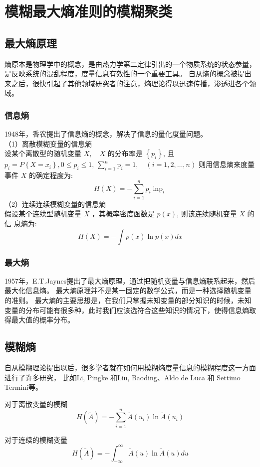 \chapter[模糊最大熵准则的模糊聚类模型]{模糊最大熵准则的模糊聚类}
\section{最大熵原理}
熵原本是物理学中的概念，是由热力学第二定律引出的一个物质系统的状态参量，是反映系统的混乱程度，度量信息有效性的一个重要工具。
自从熵的概念被提出来之后，很快引起了其他领域研究者的注意，熵理论得以迅速传播，渗透进各个领域。
\subsection{信息熵}
1948年，香农\cite{1948A}提出了信息熵的概念，解决了信息的量化度量问题。\\
（1）离散模糊变量的信息熵\\
设某个离散型的随机变量 $X, \quad X$ 的分布率是 $\left\{p_{i}\right\}$, 且 $p_{i}=P\left\{X=x_{i}\right\}, 0 \leq p_{i} \leq 1$,
$\sum_{i=1}^n \mathrm{p}_i=1, \quad(i=1,2 ,\dots, n)$ 则用信息熵来度量事件 $X$ 的确定程度为:
\begin{equation}
    H(X) =-\sum_{i=1}^{n} p_{i} \operatorname{\ln p}_{i}
\end{equation}
（2）连续连续模糊变量的信息熵\\
假设某个连续型随机变量 $X$ ，其概率密度函数是 $p(x)$, 则该连续随机变量 $X$ 的信
息熵为:
\begin{equation}
    H(X)=-\int p(x) \ln p(x) d x
\end{equation}

\subsection{最大熵}
1957年，E.T.Jaynes提出了最大熵原理，通过把随机变量与信息熵联系起来，然后最大化信息熵。
最大熵原理并不是某一固定的数学公式，而是一种选择随机变量的准则。
最大熵的主要思想是，在我们只掌握未知变量的部分知识的时候，未知变量的分布可能有很多种，此时我们应该选符合这些知识的情况下，使得信息熵取得最大值的概率分布。

\section{模糊熵}
自从模糊理论提出以后，很多学者就在如何用模糊熵度量信息的模糊程度这一方面进行了许多研究，
比如Li, Pingke 和Liu, Baoding\cite{li2008entropy}、Aldo de Luca 和 Settimo Termini\cite{RN3}等。
\begin{definition}[模糊熵]
    对于离散变量的模糊
    \begin{equation}
        H(\tilde{A})=-\sum_{i=1}^{n}\tilde{A}(u_i) \ln \tilde{A}(u_i)
    \end{equation}

    对于连续的模糊变量
    \begin{equation}
        H(\tilde{A})=-\int_{-\infty}^{\infty}\tilde{A}(u) \ln \tilde{A}(u) d u
    \end{equation}

\end{definition}

